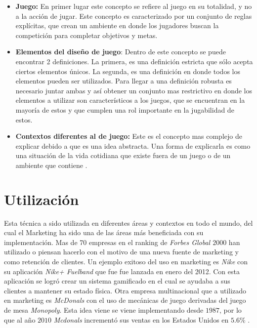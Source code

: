 \begin{itemize}
    \item {\bf Juego:}
        En primer lugar este concepto se refiere al juego en su totalidad,
        y no a la acción de jugar.
        Este concepto es caracterizado por un conjunto de reglas explícitas,
        que crean un ambiente en donde los jugadores buscan la competición para
        completar objetivos y metas.

    \item {\bf Elementos del diseño de juego}:
        Dentro de este concepto se puede encontrar 2 definiciones.
        La primera, es una definición estricta que sólo acepta ciertos elementos
        únicos.
        La segunda, es una definición en donde todos los elementos pueden ser
        utilizados.
        Para llegar a una definición robusta es necesario juntar ambas y así
        obtener un conjunto mas restrictivo en donde los elementos a utilizar
        son característicos a los juegos, que se encuentran en la mayoría de estos
        y que cumplen una rol importante en la jugabilidad de estos.

    \item {\bf Contextos diferentes al de juego:}
        Este es el concepto mas complejo de explicar debido a que es una idea
        abstracta.
        Una forma de explicarla es como una situación de la vida cotidiana
        que existe fuera de un juego o de un ambiente que contiene {\GAM}.

\end{itemize}

\section{Utilización}

Esta técnica a sido utilizada en diferentes áreas y contextos en todo el mundo,
del cual el Marketing ha sido una de las áreas más beneficiada con su
implementación.
Mas de 70 empresas en el ranking de \emph{Forbes Global $2000$} han utilizado o
piensan hacerlo con el motivo de una nueva fuente de marketing y como retención
de clientes\cite{Gam:Util:1}.
Un ejemplo exitoso del uso en marketing es \emph{Nike} con su aplicación
\emph{Nike+ Fuelband} que fue fue lanzada en enero del 2012\cite{Gam:Util:2}.
Con esta aplicación se logró crear un sistema gamificado en el cual se ayudaba
a sus clientes a mantener su estado física.
Otra empresa multinacional que a utilizado {\GAM} en marketing es \emph{McDonals}
con el uso de mecánicas de juego derivadas del juego de mesa \emph{Monopoly}.
Esta idea viene se viene implementando desde $1987$, por lo que al año $2010$
\emph{Mcdonals} incrementó sus ventas en los Estados Unidos en $5.6\%$
\cite{Gam:Util:2}.

